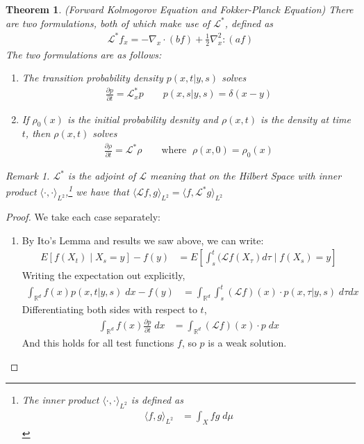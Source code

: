\documentclass[12pt]{article}
\theoremstyle{plain}
\newtheorem{thm}{Theorem}[section]
\theoremstyle{definition}
\theoremstyle{remark}
\newtheorem*{rmk}{Remark}
\begin{document}
\begin{thm}{(Forward Kolmogorov Equation and Fokker-Planck Equation)}
There are two formulations, both of which make use of $\mathscr{L}^*$,
defined as
\begin{align*}
  \mathscr{L}^*f_x = -\nabla_x \cdot (b f)
  +\frac{1}{2}\nabla^2_x : (a f)
\end{align*}
The two formulations are as follows:
\begin{enumerate}
  \item The transition probability density $p(x,t|y,s)$ solves
    \begin{align*}
      \frac{\partial p}{\partial t} = \mathscr{L}^*_x p
      \qquad p(x,s|y,s) = \delta(x-y)
    \end{align*}

  \item If $\rho_0(x)$ is the initial probability desnity and
    $\rho(x,t)$ is the density at time $t$, then $\rho(x,t)$ solves
    \begin{align}
      \frac{\partial \rho}{\partial t} = \mathscr{L}^* \rho
      \qquad \text{where } \; \rho(x,0) = \rho_0(x)
      \label{fpeqn}
    \end{align}
\end{enumerate}
\begin{rmk}
$\mathscr{L}^*$ is the adjoint of $\mathscr{L}$ meaning that
on the Hilbert Space with inner product
$\langle\cdot,\cdot\rangle_{L^2}$,\footnote{%
  The inner product $\langle\cdot,\cdot\rangle_{L^2}$ is defined as
  \begin{align*}
    \langle f,g\rangle_{L^2}
    &= \int_X fg\;d\mu
  \end{align*}
}
we have that $\langle\mathscr{L}f,g\rangle_{L^2} =\langle
f,\mathscr{L}^*g\rangle_{L^2}$
\end{rmk}
\end{thm}
\begin{proof}
We take each case separately:
\begin{enumerate}
  \item By Ito's Lemma and results we saw above, we can write:
    \begin{align*}
      E[f(X_t) \;|\; X_s=y] -f(y)
      &= E\left[\int^t_s (\mathscr{L}f(X_\tau) d\tau \;\big|\;
          f(X_s)=y\right]
    \end{align*}
    Writing the expectation out explicitly,
    \begin{align*}
      \int_{\mathbb{R}^d} f(x)p(x,t|y,s)\;dx  -f(y)
      &= \int_{\mathbb{R}^d} \int^t_s
        (\mathscr{L}f)(x) \cdot p(x,\tau|y,s)\; d\tau dx
    \end{align*}
    Differentiating both sides with respect to $t$,
    \begin{align*}
      \int_{\mathbb{R}^d} f(x) \frac{\partial p}{\partial t}\;dx
      &= \int_{\mathbb{R}^d}
        (\mathscr{L}f)(x) \cdot p\; dx
    \end{align*}
    And this holds for all test functions $f$, so $p$ is a weak
    solution.
\end{enumerate}
\end{proof}
\end{document}
